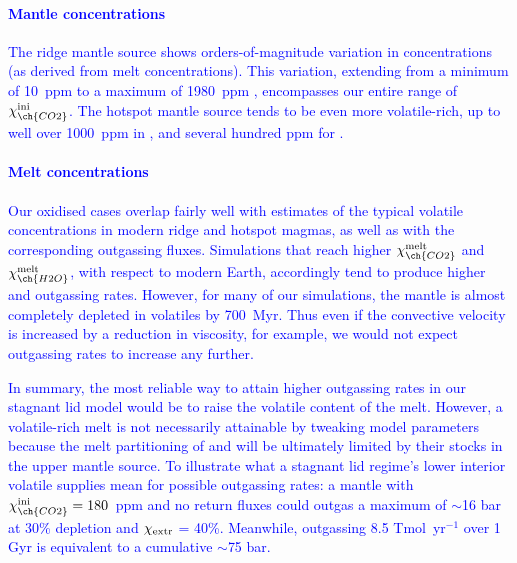 \documentclass[3p,authoryear]{elsarticle}
\newcommand{\editthree}[2]{\textcolor{blue}{\sout{#1}#2}}
\begin{document}
\editthree{}{\paragraph{Mantle concentrations} The ridge mantle source shows orders-of-magnitude variation in \ch{CO2} concentrations (as derived from melt concentrations). This variation, extending from a minimum of 10~ppm to a maximum of 1980~ppm \citep{Hauri2019}, encompasses our entire range of $\chi_{\ch{CO2}}^{\rm{ini}}$. The hotspot mantle source tends to be even more volatile-rich, up to well over 1000~ppm in \ch{CO2}, and several hundred ppm for  \citep{Wallace1998, MILLER2019}.}


\editthree{}{\paragraph{Melt concentrations} Our oxidised cases overlap fairly well with estimates of the typical volatile concentrations in modern ridge and hotspot magmas, as well as with the corresponding outgassing fluxes. Simulations that reach higher $\chi_{\ch{CO2}}^{\rm melt}$ and $\chi_{\ch{H2O}}^{\rm melt}$, with respect to modern Earth, accordingly tend to produce higher \ch{CO2} and \ch{H2O} outgassing rates. However, for many of our simulations, the mantle is almost completely depleted in volatiles by 700~Myr. Thus even if the convective velocity is increased by a reduction in viscosity, for example, we would not expect outgassing rates to increase any further.}





\vspace{0.4cm}
\editthree{}{In summary, the most reliable way to attain higher outgassing rates in our stagnant lid model would be to raise the volatile content of the melt. However, a volatile-rich melt is not necessarily attainable by tweaking model parameters because the melt partitioning of \ch{CO2} and \ch{H2O} will be ultimately limited by their stocks in the upper mantle source. To illustrate what a stagnant lid regime's lower interior volatile supplies mean for possible outgassing rates: a mantle with $\chi_{\ch{CO2}}^{\rm ini} = 180$~ppm and no return fluxes could outgas a maximum of $\sim$16 bar \ch{CO2} at 30\% depletion and $\chi_{\rm extr}$ = 40\%. Meanwhile, outgassing 8.5 Tmol~yr$^{-1}$ \ch{CO2} \citep{Catling2017} over 1 Gyr is equivalent to a cumulative $\sim$75 bar.}
\end{document}
